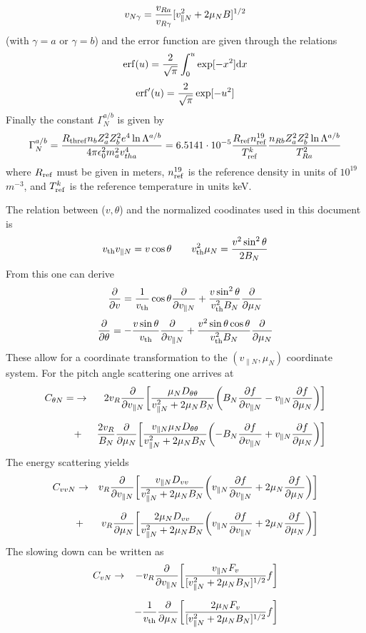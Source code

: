 \documentclass{report}
\def\be{\begin{equation}}
\def\ee{\end{equation}}
\def\bee{\begin{eqnarray}}
\def\eee{\end{eqnarray}}
\begin{document}
\be
v_{N\gamma} =  {v_{Ra} \over v_{R\gamma}}[ v_{\parallel N}^2 + 2 \mu_N B ]^{1/2} 
\ee
(with $\gamma = a$ or $\gamma = b$) and the error function are given through the relations  
\be 
{\rm erf}(u) = {2 \over \sqrt{\pi}} \int_0^u \exp [ -x^2] {\rm d} x 
\ee 
\be 
{\rm erf}^\prime(u) = {2 \over \sqrt{\pi}} \exp [ -u^2] 
\ee
Finally the constant $\Gamma^{a/b}_N$ is given by 
\be 
\Gamma^{a/b}_N = {R_{\rm thref} n_b Z_a^2 Z_b^2 e^4 \ln \Lambda^{a/b} \over 4 \pi \epsilon_0^2 m_a^2 v_{tha}^4} = 
6.5141\cdot 10^{-5} {R_{\rm ref} n_{\rm ref}^{19} \over T_{\rm ref}^k}  {n_{Rb} Z_a^2 Z_b^2 \ln \Lambda^{a/b} 
\over T_{Ra}^2}
\ee
where $R_{\rm ref}$ must be given in meters, $n_{\rm ref}^{19}$ is the reference density in units of $10^{19}$
$m^{-3}$, and $T_{\rm ref}^k$ is the reference temperature in units keV. 


The relation between ($v,\theta$) and the normalized coodinates used in this document is 
\be 
v_{\rm th} v_{\parallel N} =  v \cos \theta \qquad 
v_{\rm th}^2 \mu_N = {v^2 \sin^2 \theta \over 2 B_N}
\ee 
From this one can derive 
\be 
{\partial \over \partial v} = {1\over v_{\rm th} }\cos \theta {\partial \over \partial v_{\parallel N} } 
+ {v \sin^2 \theta \over v_{\rm th}^2 B_N} {\partial \over \partial \mu_N} 
\ee
\be 
{\partial \over \partial \theta} = - {v \sin \theta \over v_{\rm th}} {\partial \over \partial 
v_{\parallel N}} + {v^2 \sin \theta \cos \theta \over v_{\rm th}^2 B_N } {\partial \over \partial \mu_N}
\ee
These allow for a coordinate transformation to the $(v_{\parallel N}, \mu_N)$ coordinate system. 
For the pitch angle scattering one arrives at 
\bee 
C_{\theta N} =  &\rightarrow & 
{2 v_R} {\partial \over \partial v_{\parallel N}} \biggl [ {\mu_N D_{\theta \theta} \over 
v_{\parallel N}^2 + 2 \mu_N B_N} \biggl ( B_N {\partial f\over \partial v_{\parallel N}} - v_{\parallel N} 
{\partial f\over \partial \mu_N} \biggr ) \biggr ] \cr 
\noalign{\vskip 0.2 truecm} 
&+& {2 v_R \over  B_N} {\partial \over \partial \mu_N} 
\biggl [ {v_{\parallel N} \mu_N D_{\theta \theta} \over v_{\parallel N}^2 + 2 \mu_N B_N} \biggl ( - B_N 
{\partial f \over \partial v_{\parallel N}} + v_{\parallel N} {\partial f\over \partial \mu_N} \biggr ) \biggr ] 
\eee 
The energy scattering yields 
\bee 
C_{vvN} & \rightarrow & 
v_R {\partial \over \partial v_{\parallel N} } 
\biggl [  {v_{\parallel N } D_{vv} \over v_{\parallel N}^2 + 2 \mu_N B_N} \biggl ( v_{\parallel N} {\partial 
f \over \partial v_{\parallel N}} + 2 \mu_N {\partial f \over \partial \mu_N} \biggr ) \biggr ] \cr 
\noalign{\vskip 0.2 truecm}
&+& v_R {\partial \over \partial \mu_N} \biggl [ {2 \mu_N D_{vv} \over v_{\parallel N}^2 + 
2 \mu_N B_N} \biggl ( v_{\parallel N} {\partial f \over \partial v_{\parallel N}} + 2 \mu_N {\partial f \over 
\partial \mu_N}\biggr ) \biggr ] 
\eee
The slowing down can be written as 
\bee 
C_{vN}  &\rightarrow & -
v_R {\partial \over \partial v_{\parallel N} } \biggl [  {v_{\parallel N} F_v \over [ v_{\parallel N}^2 
+ 2 \mu_N B_N ]^{1/2}} f  \biggr ] \cr
\noalign{\vskip 0.2 truecm}
& & - {1 \over v_{\rm th}} {\partial \over \partial \mu_N} \biggl [ {2 \mu_N F_v \over [v_{\parallel N}^2 + 
2 \mu_N B_N]^{1/2}} f \biggr ] 
\eee 
\end{document}
